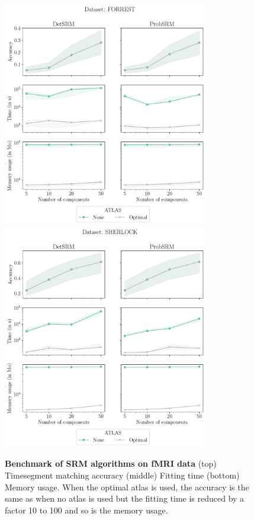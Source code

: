\begin{figure}
  \centering
  \includegraphics[width=0.8\textwidth]{figures/srm/timesegment_matching_forrest.pdf}
  \includegraphics[width=0.8\textwidth]{figures/srm/timesegment_matching_sherlock.pdf}
  \caption{\textbf{Benchmark of SRM algorithms on fMRI data} (top) Timesegment
    matching accuracy (middle) Fitting time (bottom) Memory usage. When the
    optimal atlas is used, the accuracy is the same as when no atlas is used but
  the fitting time is reduced by a factor 10 to 100 and so is the memory usage.}
  \label{fig:srm:timesegment}
\end{figure}


